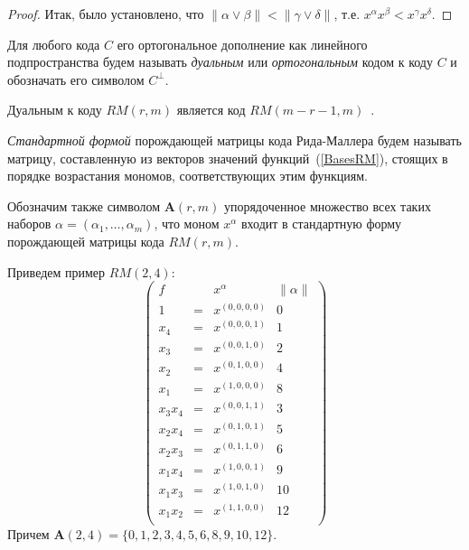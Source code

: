\begin{proof}
	Итак, было установлено, что \(\|\alpha\vee\beta\|<\|\gamma\vee\delta\|\), т.е.
	\(x^{\alpha}x^{\beta}<x^{\gamma}x^{\delta}\).

\end{proof}

Для любого кода \(C\) его ортогональное дополнение как линейного подпространства будем называть \emph{дуальным} или \emph{ортогональным} кодом к коду \(C\) и обозначать его символом \(C^{\perp}\).

Дуальным к коду \(RM(r,m)\) является код \(RM(m-r-1,m)\)~\cite{mcwilliams1979theory}.

\emph{Стандартной формой} порождающей матрицы кода Рида-Маллера будем называть матрицу, составленную из векторов значений функций~(\ref{BasesRM}), стоящих в порядке возрастания мономов, соответствующих этим функциям.

Обозначим также символом \(\mathbf{A}(r,m)\) упорядоченное множество всех  таких наборов \(\alpha=(\alpha_{1},\ldots,\alpha_{m})\), что моном \(x^\alpha\) входит в стандартную форму порождающей матрицы кода \(RM(r,m)\).

Приведем пример \(RM(2,4)\):
\begin{displaymath}
	\left(\begin{array}{cccc}
		f      &   & x^\alpha      & \|\alpha\| \\
		\hline
		1      & = & x^{(0,0,0,0)} & 0          \\
		x_4    & = & x^{(0,0,0,1)} & 1          \\
		x_3    & = & x^{(0,0,1,0)} & 2          \\
		x_2    & = & x^{(0,1,0,0)} & 4          \\
		x_1    & = & x^{(1,0,0,0)} & 8          \\
		x_3x_4 & = & x^{(0,0,1,1)} & 3          \\
		x_2x_4 & = & x^{(0,1,0,1)} & 5          \\
		x_2x_3 & = & x^{(0,1,1,0)} & 6          \\
		x_1x_4 & = & x^{(1,0,0,1)} & 9          \\
		x_1x_3 & = & x^{(1,0,1,0)} & 10         \\
		x_1x_2 & = & x^{(1,1,0,0)} & 12         \\
	\end{array}\right)
\end{displaymath}
Причем \(\mathbf{A}(2,4)=\{0,1,2,3,4,5,6,8,9,10,12\}\).

